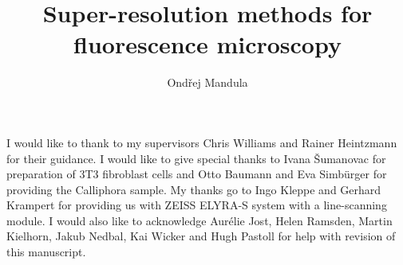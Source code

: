 \documentclass[phd,ianc,oneside,logo,leftchapter,12pt,doublespacing]{infthesis}
\title{Super-resolution methods for fluorescence microscopy}
\author{Ond\v rej Mandula}
\newcommand{\fix}{\marginpar{FIX}}
\newcommand{\home}{/Users/ondrej/}
\begin{document}
\begin{preliminary}



\maketitle

\begin{acknowledgements}
I would like to thank to my supervisors Chris Williams and Rainer Heintzmann for their guidance. I would like to give special thanks to Ivana \v Sumanovac for preparation of 3T3 fibroblast cells and Otto Baumann and Eva Simb\" urger for providing the Calliphora sample. My thanks go to Ingo Kleppe and Gerhard Krampert for providing us with ZEISS ELYRA-S system with a line-scanning module. I would also like to acknowledge Aur\' elie Jost, Helen Ramsden, Martin Kielhorn, Jakub Nedbal, Kai Wicker and Hugh Pastoll for help with revision of this manuscript. 
\end{acknowledgements}

\standarddeclaration
{

\singlespace

\tableofcontents
}
\end{preliminary}






\appendix




%

%

\singlespace

\end{document}
